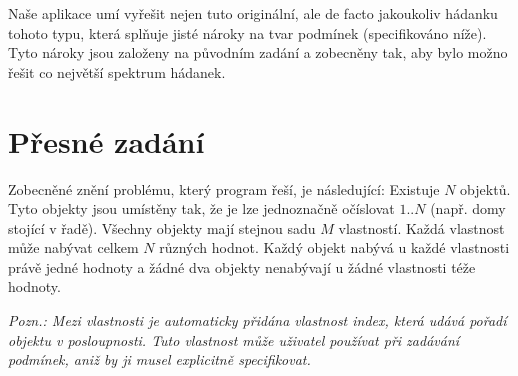 \documentclass[11pt]{article} %
\begin{document}
Naše aplikace umí vyřešit nejen tuto originální, ale de facto jakoukoliv hádanku tohoto typu, která splňuje jisté nároky na tvar podmínek (specifikováno níže). Tyto nároky jsou založeny na původním zadání a zobecněny tak, aby bylo možno řešit co největší spektrum hádanek.

\section{Přesné zadání}
Zobecněné znění problému, který program řeší, je následující: Existuje $N$ objektů. Tyto objekty jsou umístěny tak, že je lze jednoznačně očíslovat $1 .. N$ (např. domy stojící v řadě). Všechny objekty mají stejnou sadu $M$ vlastností. Každá vlastnost může nabývat celkem $N$ různých hodnot. Každý objekt nabývá u každé vlastnosti právě jedné hodnoty a žádné dva objekty nenabývají u žádné vlastnosti téže hodnoty. 

\emph{Pozn.: Mezi vlastnosti je automaticky přidána vlastnost \emph{index}, která udává pořadí objektu v posloupnosti. Tuto vlastnost může uživatel používat při zadávání podmínek, aniž by ji musel explicitně specifikovat.}
\end{document}
